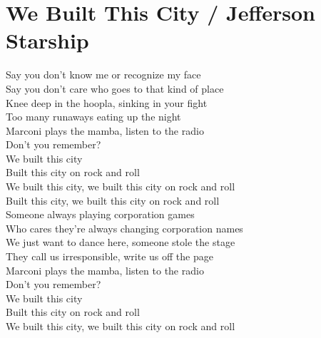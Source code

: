 \section{We Built This City / Jefferson Starship}\label{sec:webuiltthiscity}

\Gmajor
\Cmajor
\Fmajor
\DmajorEasy
\Eminor
\CmajorSeven
\Bminor

Say you don't know me or recognize my face\\
Say you don't care who goes to that kind of place\\
Knee deep in the hoopla, sinking in your fight\\
Too many runaways eating up the night\\
 Marconi plays the mamba, listen to the radio \\
Don't you remember? \\
We built this city  \\
Built this city on rock and  roll \\
We built this city, we built this city on rock and roll\\
Built this city, we built this city on rock and roll\\
 Someone always playing corporation games \\
Who cares they're always changing corporation names \\
We just want to dance here, someone stole the stage \\
They call us irresponsible, write us off the page \\
 Marconi plays the mamba, listen to the radio \\
Don't you remember? \\
We built this city  \\
Built this city on rock and  roll \\
We built this city, we built this city on rock and roll\\
